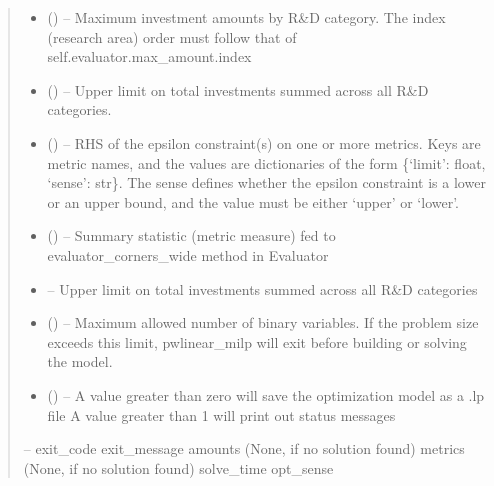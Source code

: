 \documentclass[letterpaper,10pt,english]{sphinxmanual}
\begin{document}
\begin{fulllineitems}
\begin{fulllineitems}
\begin{quote}
\begin{description}
\begin{itemize}
\item {} 
\sphinxAtStartPar
{} () – Maximum investment amounts by R\&D category. The index (research area)
order must follow that of self.evaluator.max\_amount.index

\item {} 
\sphinxAtStartPar
{} () – Upper limit on total investments summed across all R\&D categories.

\item {} 
\sphinxAtStartPar
{} () – RHS of the epsilon constraint(s) on one or more metrics. Keys are metric
names, and the values are dictionaries of the form
\{‘limit’: float, ‘sense’: str\}. The sense defines whether the epsilon
constraint is a lower or an upper bound, and the value must be either
‘upper’ or ‘lower’.

\item {} 
\sphinxAtStartPar
{} () – Summary statistic (metric measure) fed to evaluator\_corners\_wide method
in Evaluator

\item {} 
\sphinxAtStartPar
{} – Upper limit on total investments summed across all R\&D categories

\item {} 
\sphinxAtStartPar
{} () – Maximum allowed number of binary variables. If the problem size exceeds
this limit, pwlinear\_milp will exit before building or solving the model.

\item {} 
\sphinxAtStartPar
{} () – A value greater than zero will save the optimization model as a .lp file
A value greater than 1 will print out status messages

\end{itemize}

\sphinxAtStartPar
{} – exit\_code
exit\_message
amounts (None, if no solution found)
metrics (None, if no solution found)
solve\_time
opt\_sense


\end{description}
\end{quote}
\end{fulllineitems}
\end{fulllineitems}
\end{document}
